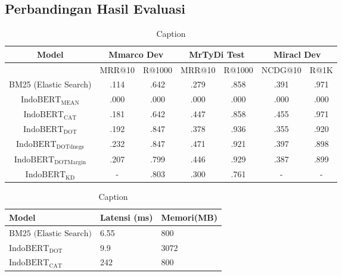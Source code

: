 \subsection{Perbandingan Hasil Evaluasi}
\label{sec:perbandinganhasil}

\begin{table}
    \centering
    \caption{Caption}
    \label{tab:evaluasisemuamodel}
    \begin{tabular}{|c|cc|cc|cc|} \hline
        Model                                & \multicolumn{2}{|c|}{Mmarco Dev} &
        \multicolumn{2}{|c|}{MrTyDi Test}    & \multicolumn{2}{|c|}{Miracl Dev}                                             \\ \hline
                                             & MRR@10                           & R@1000 & MRR@10 & R@1000 & NCDG@10 & R@1K \\ \hline
        BM25 (Elastic Search)                & .114                             & .642   & .279   & .858   & .391    & .971 \\ \hline
        $\text{IndoBERT}_{\text{MEAN}}$      & .000                             & .000   & .000   & .000   & .000    & .000 \\ \hline
        $\text{IndoBERT}_{\text{CAT}}$       & .181                             & .642   & .447   & .858   & .455    & .971 \\ \hline
        $\text{IndoBERT}_{\text{DOT}}$       & .192                             & .847   & .378   & .936   & .355    & .920 \\ \hline
        $\text{IndoBERT}_{\text{DOTdnegs}}$  & .232                             & .847   & .471   & .921   & .397    & .898 \\ \hline
        $\text{IndoBERT}_{\text{DOTMargin}}$ & .207                             & .799   & .446   & .929   & .387    & .899 \\ \hline
        $\text{IndoBERT}_{\text{KD}}$        & -                                & .803   & .300   & .761   & -       & -    \\ \hline
    \end{tabular}

\end{table}


\begin{table}[!ht]
    \centering
    \caption{Caption}
    \label{tab:latensimemori}
    \begin{tabular}{|l|l|l|}
        \hline
        Model                          & Latensi (ms) & Memori(MB) \\ \hline
        $\text{BM25 (Elastic Search)}$ & 6.55         & 800        \\ \hline
        $\text{IndoBERT}_{\text{DOT}}$ & 9.9          & 3072       \\ \hline
        $\text{IndoBERT}_{\text{CAT}}$ & 242          & 800        \\ \hline
    \end{tabular}
\end{table}